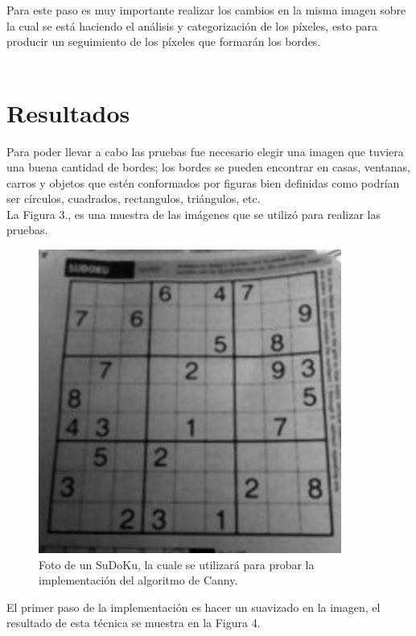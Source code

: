 \documentclass[conference]{IEEEtran}
\begin{document}
Para este paso es muy importante realizar los cambios en la misma imagen sobre la cual se est\'a haciendo el an\'alisis y categorizaci\'on de los p\'ixeles, esto para producir un seguimiento de los p\'ixeles que formar\'an los bordes.\\\\

\section{Resultados}
Para poder llevar a cabo las pruebas fue necesario elegir una imagen que tuviera una buena cantidad de bordes; los bordes se pueden encontrar en casas, ventanas, carros y objetos que est\'en conformados por figuras bien definidas como podr\'ian ser c\'irculos, cuadrados, rectangulos, tri\'angulos, etc.\\
La Figura 3., es una muestra de las im\'agenes que se utiliz\'o para realizar las pruebas.

\begin{figure}[h]
	\setlength{\unitlength}{0.115in}
	\centering
	\includegraphics[scale=0.30]{./images/11sudoku.png}
	\caption{Foto de un SuDoKu, la cuale se utilizar\'a para probar la implementaci\'on del algoritmo de Canny.}
\end{figure}

\newpage
El primer paso de la implementaci\'on es hacer un suavizado en la imagen, el resultado de esta t\'ecnica se muestra en la Figura 4.
\end{document}
